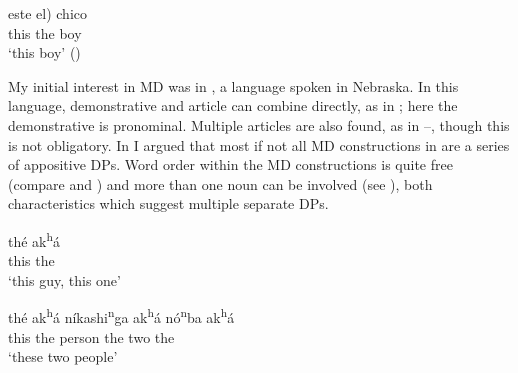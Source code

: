 \documentclass[output=paper,
colorlinks,
citecolor=brown,
newtxmath
]{langscibook}
\begin{document}
\ex
\gll este \minsp{(*} el) chico \\
    this {} the boy \\     %
\glt `this  boy' \hfill ()
\z
\z

 \noindent My initial interest in MD was in , a  language spoken in Nebraska. In this language, demonstrative and article can combine directly, as in ; here the demonstrative is pronominal. Multiple articles are also found, as in --, though this is not obligatory. In \citet{Rudin1993} I argued that most if not all MD constructions in  are a series of appositive DPs. Word order within the MD constructions is quite free (compare  and ) and more than one noun can be involved (see ), both characteristics which suggest multiple separate DPs.







\ea \label{ex:Omaha}
\ea \label{thisguy}
\gll thé ak\textsuperscript{h}á \\
     this the\\
     \glt `this  guy, this one' %

\ex \label{akha1}
\gll thé ak\textsuperscript{h}á níkashi\textsuperscript{n}ga ak\textsuperscript{h}á nó\textsuperscript{n}ba ak\textsuperscript{h}á\\
    this the person the two the \\
\glt `these two people'
\end{document}
